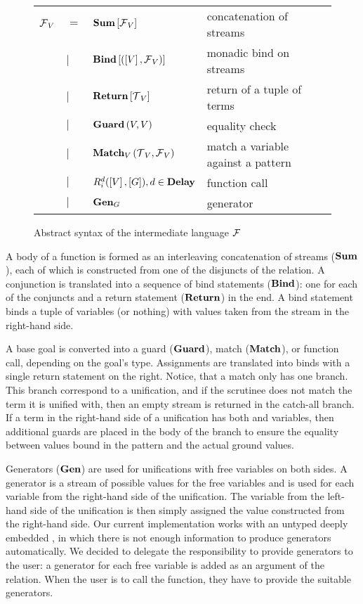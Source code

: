 \begin{figure}[h]
\begin{tabular}{llll}
    $\operatorname{\mathcal{F}}_{V}$ & $=$ & $\operatorname{\mathbf{Sum}}\left[ \operatorname{\mathcal{F}}_{V} \right]$ & concatenation of streams\\
               & $\mid$ & $\operatorname{\mathbf{Bind}}\left[ \left(\left[ V \right], \operatorname{\mathcal{F}}_{V}\right) \right] $ & monadic bind on streams\\
               & $\mid$ & $\operatorname{\mathbf{Return}} \left[ \operatorname{\mathcal{T}}_{V} \right]$ & return of a tuple of terms\\
               & $\mid$ & $\operatorname{\mathbf{Guard}}\left( V, V \right)$ & equality check\\
               & $\mid$ & $\operatorname{\mathbf{Match}}_{V} \left( \operatorname{\mathcal{T}}_{V}, \operatorname{\mathcal{F}}_{V} \right)$ & match a variable against a pattern\\
               & $\mid$ & $R_{i}^{d}(\left[ V \right], \left[ G \right]), d\in \operatorname{\mathbf{Delay}} $ & function call\\
               & $\mid$ & $\operatorname{\mathbf{Gen}}_{G}$ & generator
\end{tabular}
\caption{Abstract syntax of the intermediate language $\operatorname{\mathcal{F}}$}
\label{fig:intermediate}
\end{figure}


A body of a function is formed as an interleaving concatenation of streams ($\operatorname{\mathbf{Sum}}$), each of which is constructed from one of the disjuncts of the relation.
A conjunction is translated into a sequence of bind statements ($\operatorname{\mathbf{Bind}}$): one for each of the conjuncts and a return statement ($\operatorname{\mathbf{Return}}$) in the end.
A bind statement binds a tuple of variables (or nothing) with values taken from the stream in the right-hand side.

A base goal is converted into a guard ($\operatorname{\mathbf{Guard}}$), match ($\operatorname{\mathbf{Match}}$), or function call, depending on the goal's type.
Assignments are translated into binds with a single return statement on the right.
Notice, that a match only has one branch.
This branch correspond to a unification, and if the scrutinee does not match the term it is unified with, then an empty stream is returned in the catch-all branch.
If a term in the right-hand side of a unification has both \outm and \inm variables, then additional guards are placed in the body of the branch to ensure the equality between values bound in the pattern and the actual ground values.

Generators ($\operatorname{\mathbf{Gen}}$) are used for unifications with free variables on both sides.
A generator is a stream of possible values for the free variables and is used for each variable from the right-hand side of the unification.
The variable from the left-hand side of the unification is then simply assigned the value constructed from the right-hand side.
Our current implementation works with an untyped deeply embedded \mk, in which there is not enough information to produce generators automatically.
We decided to delegate the responsibility to provide generators to the user: a generator for each free variable is added as an argument of the relation.
When the user is to call the function, they have to provide the suitable generators.

